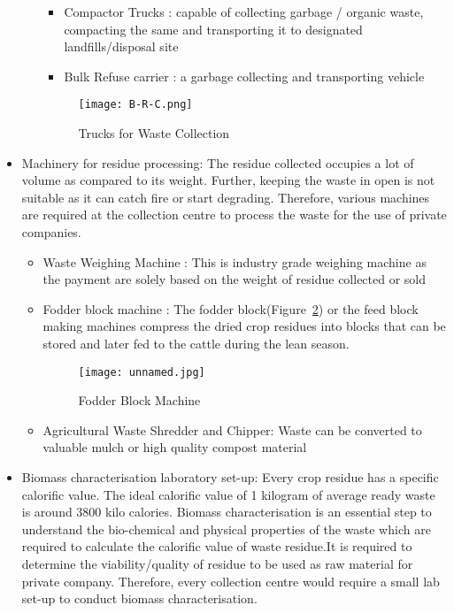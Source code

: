 \documentclass[conference]{IEEEtran}
\begin{document}
\begin{itemize}
\begin{itemize}
\begin{itemize}
            \item Compactor Trucks : capable of collecting garbage / organic waste, compacting  the same and transporting it to designated landfills/disposal site
            \item Bulk Refuse carrier : a garbage collecting and transporting vehicle
            \end{itemize}
    \begin{figure}[htbp]
\centerline{\texttt{[image: B-R-C.png]}}
\caption{Trucks for Waste Collection}
\label{fig:8}
\end{figure}
\end{itemize}
\item Machinery for residue processing: 
    The residue collected occupies a lot of volume as compared to its weight. Further, keeping the waste in open is not suitable as it can catch fire or start degrading. Therefore, various machines are required at the collection centre to process the waste for the use of private companies. 
    \begin{itemize}
        \item Waste Weighing Machine : This is industry grade weighing machine as the payment are solely based on the weight of residue collected or sold 
        \item Fodder block machine : The fodder block(Figure~\ref{fig:9}) or the feed block making machines compress the dried crop residues into blocks that can be stored and later fed to the cattle during the lean season.
         \begin{figure}[htbp]
         \centerline{\texttt{[image: unnamed.jpg]}}
         \caption{Fodder Block Machine}
         \label{fig:9}
         \end{figure}
\item Agricultural Waste Shredder and Chipper: Waste can be converted to valuable mulch or high quality compost material
\end{itemize}
\item Biomass characterisation laboratory set-up: Every crop residue has a specific calorific value. The ideal calorific value of 1 kilogram of average ready waste is around 3800 kilo calories. Biomass characterisation is an essential step to understand the bio-chemical and physical properties of the waste which are required to calculate the calorific value of waste residue.It is required to determine the viability/quality of residue to be used as raw material for private company. Therefore, every collection centre would require a small lab set-up to conduct biomass characterisation.
\end{itemize}
 
\end{document}
